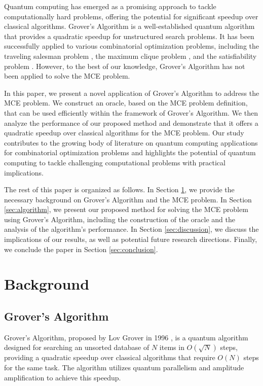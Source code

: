 Quantum computing has emerged as a promising approach to tackle computationally hard problems, offering the potential for significant speedup over classical algorithms. Grover's Algorithm \cite{grover1996} is a well-established quantum algorithm that provides a quadratic speedup for unstructured search problems. It has been successfully applied to various combinatorial optimization problems, including the traveling salesman problem \cite{TSP_grover}, the maximum clique problem \cite{max_clique_grover}, and the satisfiability problem \cite{sat_grover}. However, to the best of our knowledge, Grover's Algorithm has not been applied to solve the MCE problem.

In this paper, we present a novel application of Grover's Algorithm to address the MCE problem. We construct an oracle, based on the MCE problem definition, that can be used efficiently within the framework of Grover's Algorithm. We then analyze the performance of our proposed method and demonstrate that it offers a quadratic speedup over classical algorithms for the MCE problem. Our study contributes to the growing body of literature on quantum computing applications for combinatorial optimization problems and highlights the potential of quantum computing to tackle challenging computational problems with practical implications.

The rest of this paper is organized as follows. In Section \ref{sec:background}, we provide the necessary background on Grover's Algorithm and the MCE problem. In Section \ref{sec:algorithm}, we present our proposed method for solving the MCE problem using Grover's Algorithm, including the construction of the oracle and the analysis of the algorithm's performance. In Section \ref{sec:discussion}, we discuss the implications of our results, as well as potential future research directions. Finally, we conclude the paper in Section \ref{sec:conclusion}.

\section{Background}
\label{sec:background}

\subsection{Grover's Algorithm}
\label{subsec:grover}

Grover's Algorithm, proposed by Lov Grover in 1996 \cite{grover1996}, is a quantum algorithm designed for searching an unsorted database of $N$ items in $O(\sqrt{N})$ steps, providing a quadratic speedup over classical algorithms that require $O(N)$ steps for the same task. The algorithm utilizes quantum parallelism and amplitude amplification to achieve this speedup.

